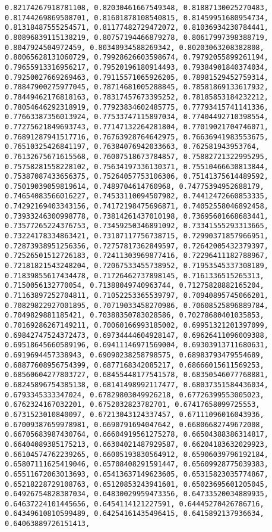 \documentclass[11pt]{article}
\begin{document}
\begin{Verbatim}[commandchars=\\\{\}]
0.82174267918781108, 0.82030461667549348, 0.81887130025270483, 0.81744269869508701, 0.81601878108540815, 0.81459951680954734, 0.81318487555254571, 0.81177482729472072, 0.81036934230784441, 0.80896839115138219, 0.80757194466879278, 0.80617997398388719, 0.8047924504972459, 0.80340934588269342, 0.80203063208382808, 0.80065628131060729, 0.79928626603598674, 0.79792055899261194, 0.79655913316956217, 0.79520196180914493, 0.79384901840374034, 0.79250027669269463, 0.79115571065926205, 0.78981529452759314, 0.78847900275977045, 0.78714681005288845, 0.78581869133617932, 0.78449462176818163, 0.78317457673395252, 0.78185853184232212, 0.78054646292318919, 0.77923834602485775, 0.77793415741141336, 0.77663387356013924, 0.77533747115897034, 0.77404492710398554, 0.77275621849693743, 0.77147132264281804, 0.77019021704746071, 0.76891287941517716, 0.76763928764642975, 0.76636941983553675, 0.76510325426841197, 0.76384076942033663, 0.762581943953764, 0.76132675671615568, 0.76007518673784857, 0.75882721322995295, 0.75758281558228102, 0.75634197336130371, 0.75510466630813844, 0.75387087433656375, 0.75264057753106306, 0.75141375614489592, 0.75019039059819614, 0.7489704614760968, 0.74775394952688179, 0.74654083566016227, 0.74533110094507982, 0.74412472660853335, 0.74292169403343156, 0.74172198475696871, 0.74052558046892458, 0.73933246300998778, 0.73814261437010198, 0.73695601668683441, 0.73577265224376753, 0.73459250346891092, 0.73341555293313665, 0.73224178334863421, 0.73107117756738715, 0.72990371857966951, 0.72873938951256356, 0.72757817362849597, 0.72642005432379397, 0.72526501512726183, 0.72411303969877416, 0.72296411182788967, 0.72181821543248204, 0.72067533455738952, 0.71953545337308189, 0.71839855617434478, 0.71726462737898145, 0.7161336515265313, 0.7150056132770054, 0.71388049740963744, 0.71275828882165204, 0.71163897252704811, 0.71052253365539797, 0.70940895745066201, 0.70829822927001895, 0.70719033458270986, 0.70608525896889784, 0.7049829881185421, 0.70388350783028586, 0.70278680401035853, 0.70169286267149211, 0.70060166993185002, 0.69951321201397099, 0.69842747524372473, 0.69734444604928147, 0.69626411096009388, 0.69518645660589196, 0.69411146971569004, 0.69303913711680631, 0.6919694457338943, 0.69090238258798575, 0.68983793479554689, 0.68877608956754399, 0.6877168342085217, 0.68666015611569253, 0.68560604277803727, 0.68455448177541578, 0.68350546077768881, 0.68245896754385138, 0.68141498992117477, 0.68037351584436034, 0.6793345333347024, 0.67829803049926218, 0.67726399553005023, 0.6762324167032201, 0.6752032823782701, 0.67417658099725553, 0.6731523010840097, 0.67213043124337457, 0.67111096016043936, 0.67009387659978981, 0.6690791694047642, 0.66806682749672008, 0.66705683987430764, 0.66604919561275278, 0.66504388386314817, 0.66404089385175213, 0.66304021487929587, 0.66204183632029923, 0.66104574762239265, 0.66005193830564912, 0.65906039796192184, 0.65807111625419046, 0.65708408291591447, 0.65609928775039383, 0.65511672063013693, 0.65413637149623605, 0.65315823035774867, 0.65218228729108763, 0.65120853243941601, 0.65023695601205045, 0.64926754828387034, 0.64830029959473356, 0.64733520034889935, 0.64637224101445656, 0.6454114121227591, 0.64445270426786716, 0.64349610810599489, 0.64254161435496415, 0.6415892137936634, 0.64063889726151413, 
\end{Verbatim}
\end{document}
